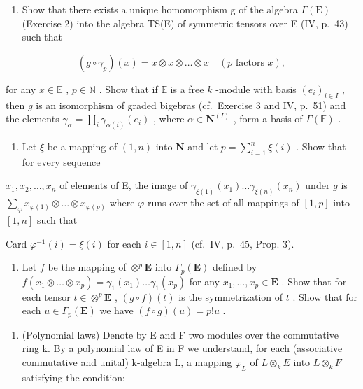 \begin{enumerate}
\def\labelenumi{\alph{enumi})}
\tightlist
\item
  Show that there exists a unique homomorphism g of the algebra \(\Gamma(\mathrm{E})\) (Exercise 2) into the algebra TS(E) of symmetric tensors over E (IV, p.~43) such that
\end{enumerate}

\[
(g \circ \gamma_ {p}) (x) = x \otimes x \otimes \dots \otimes x \quad (p \text {   factors   } x),
\]

for any \(x \in \mathbb{E}\) , \(p \in \mathbb{N}\) . Show that if \(\mathbb{E}\) is a free \(k\) -module with basis \((e_i)_{i \in I}\) , then \(g\) is an isomorphism of graded bigebras (cf.~Exercise 3 and IV, p.~51) and the elements \(\gamma_\alpha = \prod_i \gamma_{\alpha(i)}(e_i)\) , where \(\alpha \in \mathbf{N}^{(I)}\) , form a basis of \(\Gamma(\mathbb{E})\) .

\begin{enumerate}
\def\labelenumi{\alph{enumi})}
\setcounter{enumi}{1}
\tightlist
\item
  Let \(\xi\) be a mapping of \((1, n)\) into \(\mathbf{N}\) and let \(p = \sum_{i=1}^{n} \xi(i)\) . Show that for every sequence
\end{enumerate}

\(x_{1}, x_{2}, \ldots, x_{n}\) of elements of E, the image of \(\gamma_{\xi(1)}(x_{1}) \ldots \gamma_{\xi(n)}(x_{n})\) under \(g\) is \(\sum_{\varphi} x_{\varphi(1)} \otimes \ldots \otimes x_{\varphi(p)}\) where \(\varphi\) runs over the set of all mappings of \([1, p]\) into \([1, n]\) such that

Card \(\varphi^{-1}(i) = \xi(i)\) for each \(i \in [1, n]\) (cf.~IV, p.~45, Prop. 3).

\begin{enumerate}
\def\labelenumi{\alph{enumi})}
\setcounter{enumi}{2}
\tightlist
\item
  Let \(f\) be the mapping of \(\otimes^p \mathbf{E}\) into \(\Gamma_p(\mathbf{E})\) defined by \(f(x_1 \otimes \ldots \otimes x_p) = \gamma_1(x_1) \ldots \gamma_1(x_p)\) for any \(x_1, \ldots, x_p \in \mathbf{E}\) . Show that for each tensor \(t \in \otimes^p \mathbf{E}\) , \((g \circ f)(t)\) is the symmetrization of \(t\) . Show that for each \(u \in \Gamma_p(\mathbf{E})\) we have \((f \circ g)(u) = p! u\) .
\end{enumerate}

\begin{enumerate}
\def\labelenumi{\arabic{enumi})}
\setcounter{enumi}{8}
\tightlist
\item
  (Polynomial laws) Denote by E and F two modules over the commutative ring k. By a polynomial law of E in F we understand, for each (associative commutative and unital) k-algebra L, a mapping \(\varphi_{L}\) of \(L \otimes_{k} E\) into \(L \otimes_{k} F\) satisfying the condition:
\end{enumerate}

